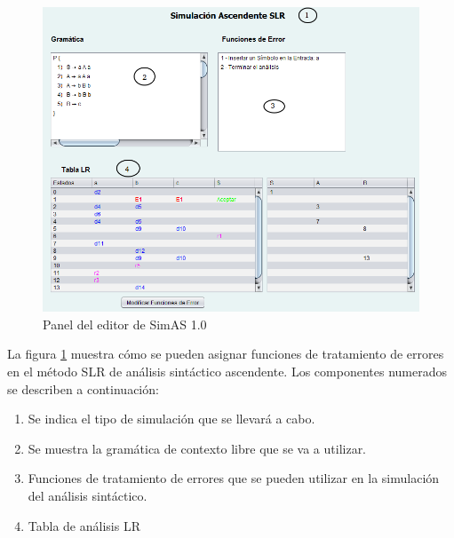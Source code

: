  \begin{figure}[!t]
   \begin{center}
      \includegraphics[scale=0.40]{figuras/Cap3/da12.png} 
       \caption{Panel del editor de SimAS 1.0 }\label{fig:SimAS-1.0-editor-funciones-de-error}
 	\end{center}
   \end{figure}

La figura \ref{fig:SimAS-1.0-editor-funciones-de-error} muestra cómo se pueden asignar funciones de tratamiento de errores en el método SLR de análisis sintáctico ascendente. Los componentes numerados se describen a continuación:
\begin{enumerate}
     \item Se indica el tipo de simulación que se llevará a cabo.
     \item Se muestra la gramática de contexto libre que se va a utilizar.
     \item Funciones de tratamiento de errores que se pueden utilizar en  la simulación del análisis sintáctico.
     \item Tabla de análisis LR
\end{enumerate}

